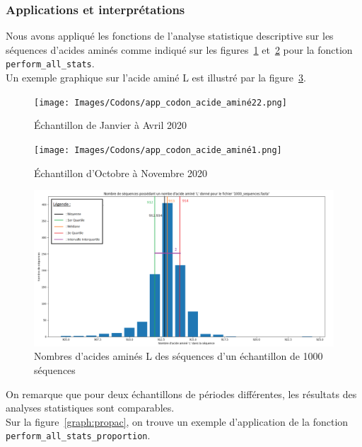 \documentclass[12pt]{article}
\begin{document}
\subsubsection{Applications et interprétations}
Nous avons appliqué les fonctions de l'analyse statistique descriptive sur les séquences d'acides aminés comme indiqué sur les figures~\ref{fig: echantillonJanvAvril} et~\ref{fig: echantillonOctNov} pour la fonction \texttt{perform\_all\_stats}.\\
Un exemple graphique sur l'acide aminé L est illustré par la figure~\ref{graph:acL}.

     \begin{figure}[!h]
        \centering
        \texttt{[image: Images/Codons/app\_codon\_acide\_aminé22.png]}
        \caption{Échantillon de Janvier à Avril 2020}
        \label{fig: echantillonJanvAvril}
    \end{figure}
    
     \begin{figure}[!h]
        \centering
        \texttt{[image: Images/Codons/app\_codon\_acide\_aminé1.png]}
        \caption{Échantillon d'Octobre à Novembre 2020}
        \label{fig: echantillonOctNov}
    \end{figure}

 
    \begin{figure}[!h]
        \centering
        \includegraphics[scale = 0.7]{Images/Stats/Codons/graphe_acide_L.png}
        \caption{Nombres d'acides aminés L des séquences d'un échantillon de 1000 séquences}      \label{graph:acL}
    \end{figure}
    
\newpage

On remarque que pour deux échantillons de périodes différentes, les résultats des analyses statistiques sont comparables. \\
Sur la figure~\ref{graph:propac}, on trouve un exemple d'application de la fonction \texttt{perform\_all\_stats\_proportion}.
\end{document}
